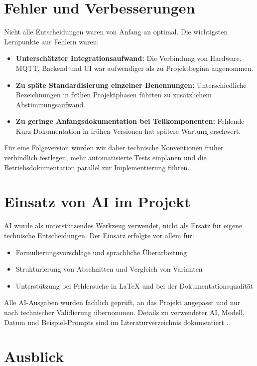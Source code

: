 \section{Fehler und Verbesserungen}

Nicht alle Entscheidungen waren von Anfang an optimal. Die wichtigsten Lernpunkte aus Fehlern waren:

\begin{itemize}
    \item \textbf{Unterschätzter Integrationsaufwand:} Die Verbindung von Hardware, MQTT, Backend und UI war aufwendiger als zu Projektbeginn angenommen.
    \item \textbf{Zu späte Standardisierung einzelner Benennungen:} Unterschiedliche Bezeichnungen in frühen Projektphasen führten zu zusätzlichem Abstimmungsaufwand.
    \item \textbf{Zu geringe Anfangsdokumentation bei Teilkomponenten:} Fehlende Kurz-Dokumentation in frühen Versionen hat spätere Wartung erschwert.
\end{itemize}

Für eine Folgeversion würden wir daher technische Konventionen früher verbindlich festlegen, mehr automatisierte Tests einplanen und die Betriebsdokumentation parallel zur Implementierung führen.

\section{Einsatz von AI im Projekt}

AI wurde als unterstützendes Werkzeug verwendet, nicht als Ersatz für eigene technische Entscheidungen. Der Einsatz erfolgte vor allem für:

\begin{itemize}
    \item Formulierungsvorschläge und sprachliche Überarbeitung
    \item Strukturierung von Abschnitten und Vergleich von Varianten
    \item Unterstützung bei Fehlersuche in LaTeX und bei der Dokumentationsqualität
\end{itemize}

Alle AI-Ausgaben wurden fachlich geprüft, an das Projekt angepasst und nur nach technischer Validierung übernommen. Details zu verwendeter AI, Modell, Datum und Beispiel-Prompts sind im Literaturverzeichnis dokumentiert \cite{github_copilot_gpt53_2026,openai_chatgpt_2026}.

\section{Ausblick}

